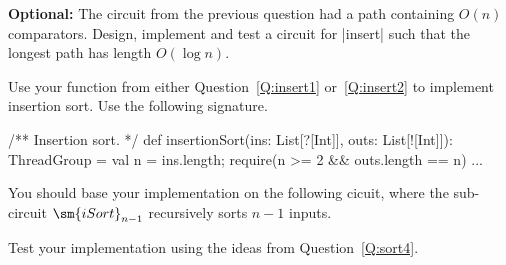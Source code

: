 \documentclass[12pt,a4paper]{article}
\begin{document}

\begin{question}
\label{Q:insert2}
\textbf{Optional:} The circuit from the previous question had a path
containing $O(n)$ comparators.  Design, implement and test a circuit for
|insert| such that the longest path has length $O(\log n)$.
\end{question}


\begin{question}
Use your function from either Question~\ref{Q:insert1} or~\ref{Q:insert2} to
implement insertion sort.  Use the following signature.
%
\begin{scala}
  /** Insertion sort. */
  def insertionSort(ins: List[?[Int]], outs: List[![Int]]): ThreadGroup = {
    val n = ins.length; require(n >= 2 && outs.length == n)
    ...
  }
\end{scala}
%
You should base your implementation on the following cicuit, where the
sub-circuit $\sm{iSort}_{n-1}$ recursively sorts $n-1$ inputs.

\begin{center}
\def\width{9.5} %
\def\recStart{1.5} %
\def\recWidth{2.5} %
\def\recEnd{\recStart+\recWidth} %
\def\insStart{5.5}
\def\insWidth{2.5}
\def\insEnd{\insStart+\insWidth}
%
\end{center}

%

Test your implementation using the ideas from Question~\ref{Q:sort4}.
\end{question}
\end{document}
